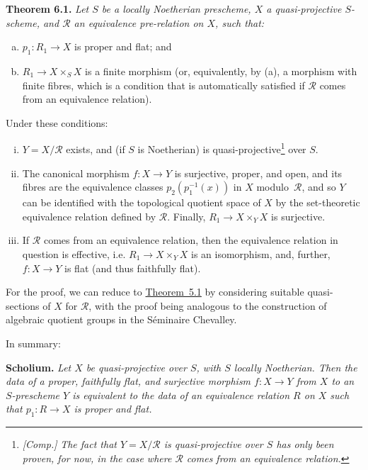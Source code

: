 \documentclass{article}
\newenvironment{itenv}[1]
  {\phantomsection\par\medskip\noindent\textbf{#1.}\itshape}
  {\medskip}
\renewcommand{\cal}[1]{{\mathcal{#1}}}
\newcommand{\oldpage}[1]{\marginpar{\footnotesize$\Big\vert$ \textit{p.~#1}}}
\begin{document}
\begin{itenv}{Theorem 6.1}
\label{theorem6.1}
  Let $S$ be a \emph{locally Noetherian} prescheme, $X$ a \emph{quasi-projective} $S$-scheme, and $\cal{R}$ an equivalence pre-relation on $X$, such that:
\oldpage{212-15}
  \begin{enumerate}[(a)]
    \item $p_1\colon R_1\to X$ is proper and flat; and
    \item $R_1\to X\times_S X$ is a finite morphism (or, equivalently, by (a), a morphism with finite fibres, which is a condition that is automatically satisfied if $\cal{R}$ comes from an equivalence relation).
  \end{enumerate}
  Under these conditions:
  \begin{enumerate}[(i)]
    \item $Y=X/\cal{R}$ exists, and (if $S$ is Noetherian) is quasi-projective\footnote{\emph{[Comp.]} \emph{The fact that $Y=X/\cal{R}$ is quasi-projective over $S$ has only been proven, for now, in the case where $\cal{R}$ comes from an equivalence relation.}} over $S$.
    \item The canonical morphism $f\colon X\to Y$ is surjective, proper, and open, and its fibres are the equivalence classes $p_2(p_1^{-1}(x))$ in $X$ modulo~$\cal{R}$, and so $Y$ can be identified with the topological quotient space of $X$ by the set-theoretic equivalence relation defined by $\cal{R}$.
      Finally, $R_1\to X\times_Y X$ is surjective.
    \item If $\cal{R}$ comes from an equivalence relation, then the equivalence relation in question is effective, i.e. $R_1\to X\times_Y X$ is an isomorphism, and, further, $f\colon X\to Y$ is flat (and thus faithfully flat).
  \end{enumerate}
\end{itenv}

For the proof, we can reduce to \hyperref[theorem5.1]{Theorem~5.1} by considering suitable quasi-sections of $X$ for $\cal{R}$, with the proof being analogous to the construction of algebraic quotient groups in the S\'{e}minaire Chevalley.

In summary:

\begin{itenv}{Scholium}
  Let $X$ be quasi-projective over $S$, with $S$ locally Noetherian.
  Then the data of a proper, faithfully flat, and surjective morphism $f\colon X\to Y$ from $X$ to an $S$-prescheme $Y$ is equivalent to the data of an equivalence relation $R$ on $X$ such that $p_1\colon R\to X$ is proper and flat.
\end{itenv}
\end{document}
